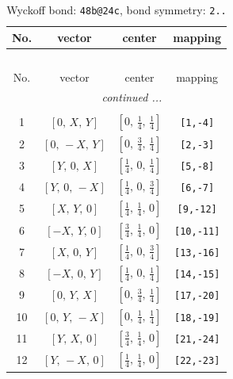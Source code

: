 \documentclass[fleqn,8pt]{jsarticle}
\begin{document}
\renewcommand{\arraystretch}{1.2}
\begin{longtable}{cccc}
\caption{Wyckoff bond: {\tt 48b@24c}, bond symmetry: {\tt 2..}}
 \\
 \hline \hline
No. & vector & center & mapping \\ \hline \endfirsthead

\multicolumn{3}{l}{\tablename\ \thetable{}} \\
 \hline \hline
No. & vector & center & mapping \\ \hline \endhead

 \hline \hline
\multicolumn{3}{r}{\footnotesize\it continued ...} \\ \endfoot

 \hline \hline
\multicolumn{3}{r}{} \\ \endlastfoot

1 & $\left[ 0,\, X,\, Y \right]$ & $\left[ 0,\, \frac{1}{4},\, \frac{1}{4} \right]$ & {\tt [1,-4]} \\ \hline
2 & $\left[ 0,\, - X,\, Y \right]$ & $\left[ 0,\, \frac{3}{4},\, \frac{1}{4} \right]$ & {\tt [2,-3]} \\ \hline
3 & $\left[ Y,\, 0,\, X \right]$ & $\left[ \frac{1}{4},\, 0,\, \frac{1}{4} \right]$ & {\tt [5,-8]} \\ \hline
4 & $\left[ Y,\, 0,\, - X \right]$ & $\left[ \frac{1}{4},\, 0,\, \frac{3}{4} \right]$ & {\tt [6,-7]} \\ \hline
5 & $\left[ X,\, Y,\, 0 \right]$ & $\left[ \frac{1}{4},\, \frac{1}{4},\, 0 \right]$ & {\tt [9,-12]} \\ \hline
6 & $\left[ - X,\, Y,\, 0 \right]$ & $\left[ \frac{3}{4},\, \frac{1}{4},\, 0 \right]$ & {\tt [10,-11]} \\ \hline
7 & $\left[ X,\, 0,\, Y \right]$ & $\left[ \frac{1}{4},\, 0,\, \frac{3}{4} \right]$ & {\tt [13,-16]} \\ \hline
8 & $\left[ - X,\, 0,\, Y \right]$ & $\left[ \frac{1}{4},\, 0,\, \frac{1}{4} \right]$ & {\tt [14,-15]} \\ \hline
9 & $\left[ 0,\, Y,\, X \right]$ & $\left[ 0,\, \frac{3}{4},\, \frac{1}{4} \right]$ & {\tt [17,-20]} \\ \hline
10 & $\left[ 0,\, Y,\, - X \right]$ & $\left[ 0,\, \frac{1}{4},\, \frac{1}{4} \right]$ & {\tt [18,-19]} \\ \hline
11 & $\left[ Y,\, X,\, 0 \right]$ & $\left[ \frac{3}{4},\, \frac{1}{4},\, 0 \right]$ & {\tt [21,-24]} \\ \hline
12 & $\left[ Y,\, - X,\, 0 \right]$ & $\left[ \frac{1}{4},\, \frac{1}{4},\, 0 \right]$ & {\tt [22,-23]} \\
\end{longtable}
\end{document}
